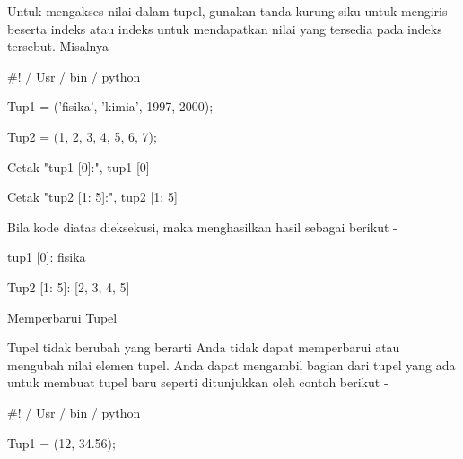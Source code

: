 \documentclass[a4paper,12pt]{report}
\begin{document}
\noindent 
{\fontsize{14pt}{14pt}\selectfont Untuk mengakses nilai dalam tupel, gunakan tanda kurung siku untuk mengiris beserta indeks atau indeks untuk mendapatkan nilai yang tersedia pada indeks tersebut. Misalnya - \\} \par
\noindent 
{\fontsize{14pt}{14pt}\selectfont  $  \#  $! / Usr / bin / python \\} \par
\vspace{14pt}
\noindent 
{\fontsize{14pt}{14pt}\selectfont Tup1 = ('fisika', 'kimia', 1997, 2000); \\} \par
\noindent 
{\fontsize{14pt}{14pt}\selectfont Tup2 = (1, 2, 3, 4, 5, 6, 7); \\} \par
\vspace{14pt}
\noindent 
{\fontsize{14pt}{14pt}\selectfont Cetak "tup1 [0]:", tup1 [0] \\} \par
\noindent 
{\fontsize{14pt}{14pt}\selectfont Cetak "tup2 [1: 5]:", tup2 [1: 5] \\} \par
\noindent 
{\fontsize{14pt}{14pt}\selectfont Bila kode diatas dieksekusi, maka menghasilkan hasil sebagai berikut - \\} \par
\noindent 
{\fontsize{14pt}{14pt}\selectfont tup1 [0]: fisika \\} \par
\noindent 
{\fontsize{14pt}{14pt}\selectfont Tup2 [1: 5]: [2, 3, 4, 5] \\} \par
\noindent 
{\fontsize{14pt}{14pt}\selectfont Memperbarui Tupel \\} \par
\noindent 
{\fontsize{14pt}{14pt}\selectfont Tupel tidak berubah yang berarti Anda tidak dapat memperbarui atau mengubah nilai elemen tupel. Anda dapat mengambil bagian dari tupel yang ada untuk membuat tupel baru seperti ditunjukkan oleh contoh berikut - \\} \par
\noindent 
{\fontsize{14pt}{14pt}\selectfont  $  \#  $! / Usr / bin / python \\} \par
\vspace{14pt}
\noindent 
{\fontsize{14pt}{14pt}\selectfont Tup1 = (12, 34.56); \\} \par
\end{document}
